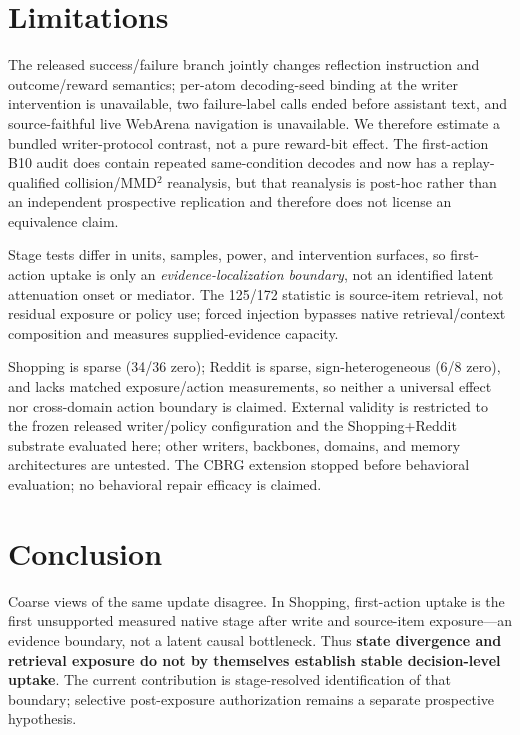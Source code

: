 \section{Limitations}
The released success/failure branch jointly changes reflection instruction and outcome/reward semantics; per-atom decoding-seed binding at the writer intervention is unavailable, two failure-label calls ended before assistant text, and source-faithful live WebArena navigation is unavailable. We therefore estimate a bundled writer-protocol contrast, not a pure reward-bit effect. The first-action B10 audit does contain repeated same-condition decodes and now has a replay-qualified collision/MMD$^2$ reanalysis, but that reanalysis is post-hoc rather than an independent prospective replication and therefore does not license an equivalence claim.

Stage tests differ in units, samples, power, and intervention surfaces, so first-action uptake is only an \emph{evidence-localization boundary}, not an identified latent attenuation onset or mediator. The 125/172 statistic is source-item retrieval, not residual exposure or policy use; forced injection bypasses native retrieval/context composition and measures supplied-evidence capacity.

Shopping is sparse (34/36 zero); Reddit is sparse, sign-heterogeneous (6/8 zero), and lacks matched exposure/action measurements, so neither a universal effect nor cross-domain action boundary is claimed. External validity is restricted to the frozen released writer/policy configuration and the Shopping+Reddit substrate evaluated here; other writers, backbones, domains, and memory architectures are untested. The CBRG extension stopped before behavioral evaluation; no behavioral repair efficacy is claimed.

\section{Conclusion}
Coarse views of the same update disagree. In Shopping, first-action uptake is the first unsupported measured native stage after write and source-item exposure---an evidence boundary, not a latent causal bottleneck. Thus \textbf{state divergence and retrieval exposure do not by themselves establish stable decision-level uptake}. The current contribution is stage-resolved identification of that boundary; selective post-exposure authorization remains a separate prospective hypothesis.
